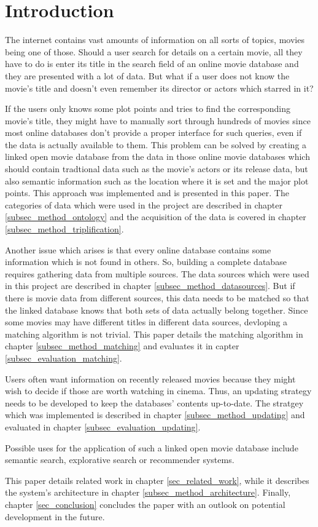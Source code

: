 \section{Introduction}
\label{sec_introduction}

The internet contains vast amounts of information on all sorts of topics, movies being one of those.
Should a user search for details on a certain movie, all they have to do is enter its title in the search field of an online movie database and they are presented with a lot of data.
But what if a user does not know the movie's title and doesn't even remember its director or actors which starred in it?

If the users only knows some plot points and tries to find the corresponding movie's title, they might have to manually sort through hundreds of movies since most online databases don't provide a proper interface for such queries, even if the data is actually available to them.
This problem can be solved by creating a linked open movie database from the data in those online movie databases which should contain tradtional data such as the movie's actors or its release data, but also semantic information such as the location where it is set and the major plot points.
This approach was implemented and is presented in this paper.
The categories of data which were used in the project are described in chapter \ref{subsec_method_ontology} and the acquisition of the data is covered in chapter \ref{subsec_method_triplification}.

Another issue which arises is that every online database contains some information which is not found in others.
So, building a complete database requires gathering data from multiple sources.
The data sources which were used in this project are described in chapter \ref{subsec_method_datasources}.
But if there is movie data from different sources, this data needs to be matched so that the linked database knows that both sets of data actually belong together.
Since some movies may have different titles in different data sources, devloping a matching algorithm is not trivial.
This paper details the matching algorithm in chapter \ref{subsec_method_matching} and evaluates it in capter \ref{subsec_evaluation_matching}.

Users often want information on recently released movies because they might wish to decide if those are worth watching in cinema.
Thus, an updating strategy needs to be developed to keep the databases' contents up-to-date.
The stratgey which was implemented is described in chapter \ref{subsec_method_updating} and evaluated in chapter \ref{subsec_evaluation_updating}.

Possible uses for the application of such a linked open movie database include semantic search, explorative search or recommender systems.

This paper details related work in chapter \ref{sec_related_work}, while it describes the system's architecture in chapter \ref{subsec_method_architecture}. Finally, chapter \ref{sec_conclusion} concludes the paper with an outlook on potential development in the future.